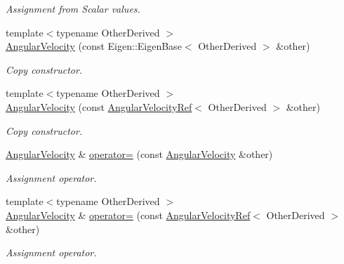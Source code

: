 \begin{DoxyCompactItemize}
\begin{DoxyCompactList}\small\item\em Assignment from Scalar values. \end{DoxyCompactList}\item 
{\footnotesize template$<$typename Other\+Derived $>$ }\\\hyperlink{classow__core_1_1AngularVelocity_a711e58379cd2a989339dfd583c9ca999}{Angular\+Velocity} (const Eigen\+::\+Eigen\+Base$<$ Other\+Derived $>$ \&other)
\begin{DoxyCompactList}\small\item\em Copy constructor. \end{DoxyCompactList}\item 
{\footnotesize template$<$typename Other\+Derived $>$ }\\\hyperlink{classow__core_1_1AngularVelocity_a41814658cf09a06b2d8d53c1855e8e7e}{Angular\+Velocity} (const \hyperlink{classow__core_1_1AngularVelocityRef}{Angular\+Velocity\+Ref}$<$ Other\+Derived $>$ \&other)
\begin{DoxyCompactList}\small\item\em Copy constructor. \end{DoxyCompactList}\item 
\hyperlink{classow__core_1_1AngularVelocity}{Angular\+Velocity} \& \hyperlink{classow__core_1_1AngularVelocity_aa238733b3f9d5b6ec9cc09ca21dbd644}{operator=} (const \hyperlink{classow__core_1_1AngularVelocity}{Angular\+Velocity} \&other)\hypertarget{classow__core_1_1AngularVelocity_aa238733b3f9d5b6ec9cc09ca21dbd644}{}\label{classow__core_1_1AngularVelocity_aa238733b3f9d5b6ec9cc09ca21dbd644}

\begin{DoxyCompactList}\small\item\em Assignment operator. \end{DoxyCompactList}\item 
{\footnotesize template$<$typename Other\+Derived $>$ }\\\hyperlink{classow__core_1_1AngularVelocity}{Angular\+Velocity} \& \hyperlink{classow__core_1_1AngularVelocity_ac8a3499e90bab07badcb8976a60ef82d}{operator=} (const \hyperlink{classow__core_1_1AngularVelocityRef}{Angular\+Velocity\+Ref}$<$ Other\+Derived $>$ \&other)\hypertarget{classow__core_1_1AngularVelocity_ac8a3499e90bab07badcb8976a60ef82d}{}\label{classow__core_1_1AngularVelocity_ac8a3499e90bab07badcb8976a60ef82d}

\begin{DoxyCompactList}\small\item\em Assignment operator. \end{DoxyCompactList}\end{DoxyCompactItemize}



